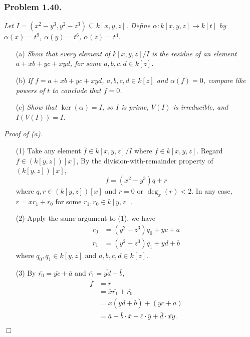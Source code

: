 \documentclass{article}
\begin{document}



\subsubsection*{Problem 1.40.}
\emph{Let $I = (x^2-y^3, y^2-z^3) \subseteq k[x,y,z]$.
Define $\alpha: k[x,y,z] \to k[t]$ by
$\alpha(x) = t^9$, $\alpha(y) = t^6$, $\alpha(z) = t^4$.}

\begin{enumerate}
\item[(a)]
  \emph{Show that every element of $k[x,y,z]/I$ is the residue of an element
  $a + xb + yc + xyd$, for some $a, b, c, d \in k[z]$.}

\item[(b)]
  \emph{If $f = a + xb + yc + xyd$, $a, b, c, d \in k[z]$ and $\alpha(f) = 0$,
  compare like powers of $t$ to conclude that $f = 0$.}

\item[(c)]
  \emph{Show that $\ker(\alpha) = I$, so $I$ is prime,
  $V(I)$ is irreducible, and $I(V(I)) = I$.} \\
\end{enumerate}



\emph{Proof of (a).}
\begin{enumerate}
\item[(1)]
  Take any element $\overline{f} \in k[x,y,z]/I$ where $f \in k[x,y,z]$.
  Regard $f \in (k[y,z])[x]$,
  By the division-with-remainder property of $(k[y,z])[x]$,
  \[
    f = (x^2 - y^3)q + r
  \]
  where $q, r \in (k[y,z])[x]$ and $r = 0$ or $\deg_{x}(r) < 2$.
  In any case,
  $r = x r_1 + r_0$ for some $r_1, r_0 \in k[y,z]$.

\item[(2)]
  Apply the same argument to (1),
  we have
  \begin{align*}
    r_0 &= (y^2 - z^3)q_0 + y c + a \\
    r_1 &= (y^2 - z^3)q_1 + y d + b
  \end{align*}
  where $q_0, q_1 \in k[y,z]$ and $a, b, c, d \in k[z]$.

\item[(3)]
  By $\overline{r_0} = \overline{y c} + \overline{a}$
  and $\overline{r_1} = \overline{y d} + \overline{b}$,
  \begin{align*}
    \overline{f}
    &= \overline{r} \\
    &= \overline{x} \overline{r_1} + \overline{r_0} \\
    &= \overline{x} (\overline{y d} + \overline{b}) + (\overline{y c} + \overline{a}) \\
    &= \overline{a} + \overline{b} \cdot \overline{x}
      + \overline{c} \cdot \overline{y} + \overline{d} \cdot \overline{xy}.
  \end{align*}
\end{enumerate}
$\Box$ \\
\end{document}
